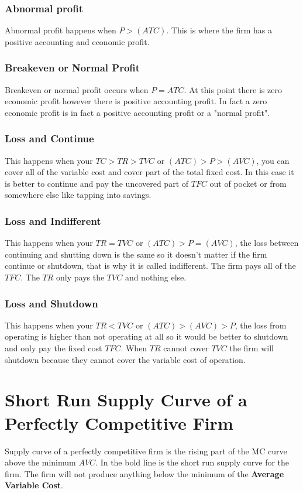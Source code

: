 \documentclass[../ECON-281-Notes.tex]{subfiles}
\begin{document}
\subsubsection{Abnormal profit}
Abnormal profit happens when $P > (ATC)$.
This is where the firm has a positive accounting and economic profit.

\subsubsection{Breakeven or Normal Profit}
Breakeven or normal profit occurs when $P = ATC$.
At this point there is zero economic profit however there is positive accounting profit.
In fact a zero economic profit is in fact a positive accounting profit or a "normal profit".

\subsubsection{Loss and Continue}
This happens when your $TC > TR > TVC$ or $(ATC) > P > (AVC)$, you can cover all of the variable cost and cover part of the total fixed cost. In this case it is better to continue and pay the uncovered part of $TFC$ out of pocket or from somewhere else like tapping into savings. 

\subsubsection{Loss and Indifferent}
This happens when your $TR = TVC$ or $(ATC) > P = (AVC)$, the loss between continuing and shutting down is the same so it doesn't matter if the firm continue or shutdown, that is why it is called indifferent.
The firm pays all of the $TFC$.
The $TR$ only pays the $TVC$ and nothing else.

\subsubsection{Loss and Shutdown}
This happens when your $TR < TVC$ or $(ATC) > (AVC) > P$, the loss from operating is higher than not operating at all so it would be better to shutdown and only pay the fixed cost $TFC$.
When $TR$ cannot cover $TVC$ the firm will shutdown because they cannot cover the variable cost of operation.

\section{Short Run Supply Curve of a Perfectly Competitive Firm}
Supply curve of a perfectly competitive firm is the rising part of the MC curve above the minimum $AVC$.
In  the bold line is the short run supply curve for the firm. The firm will not produce anything below the minimum of the \textbf{Average Variable Cost}.
\end{document}
